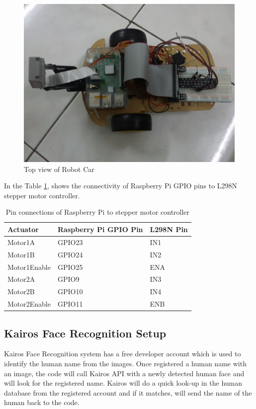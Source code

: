 \documentclass[sigconf]{acmart}
\begin{document}
\begin{figure}[htb]
  \includegraphics[width=0.8\columnwidth]{images/RobotCar_TopView.jpg}
  \caption{Top view of Robot Car}\label{F:robottop}
\end{figure}


In the Table \ref{T:pinlayout}, shows the connectivity of Raspberry Pi GPIO pins to L298N stepper 
motor controller.

\begin{table}[htb]
\caption{Pin connections of Raspberry Pi to stepper motor controller}\label{T:pinlayout}
\begin{tabular}{lll}
Actuator & Raspberry Pi GPIO Pin & L298N Pin \\
\hline
    Motor1A & GPIO23 & IN1 \\
    Motor1B & GPIO24 & IN2 \\
    Motor1Enable & GPIO25 & ENA \\
    Motor2A & GPIO9 & IN3 \\
    Motor2B & GPIO10 & IN4 \\
    Motor2Enable & GPIO11 & ENB \\
\end{tabular}
\end{table}


\subsection{Kairos Face Recognition Setup}
Kairos Face Recognition system has a free developer account which is used to identify the 
human name from the images. Once registered a human name with an image, the code will call 
Kairos API with a newly detected human face and will look for the registered name. 
Kairos will do a quick look-up in the human database from the registered account and if it 
matches, will send the name of the human back to the code.
\end{document}
